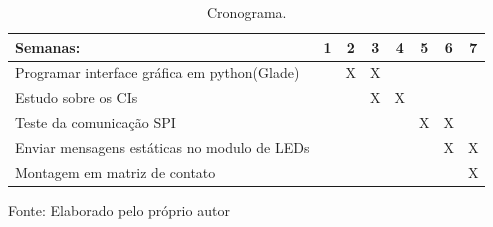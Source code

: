 \begin{table}[H]
	\centering\footnotesize
	\caption{Cronograma.}	
	\begin{tabular}{p{10cm}S[table-format=0.5]S[table-format=0.5]S[table-format=0.5]S[table-format=0.5]S[table-format=0.2]S[table-format=0.2]S[table-format=0.2]}
		\toprule	
		{Semanas:} & {1} & {2} & {3} & {4} & {5} & {6} & {7}\\
		\midrule
		
		Programar interface gráfica em python(Glade)  &  & X & X &  &  &  &  \\
		Estudo sobre os CIs &  &  & X & X &  &  &\\
		Teste da comunicação SPI    &  &  &  &  & X & X &  \\ 
		Enviar mensagens estáticas no modulo de LEDs   &  &  &  &  &  & X & X \\
		Montagem em matriz de contato & & & & & & & X\\
		\bottomrule
	\end{tabular}
	\label{table:cronogramaT1}
	\par Fonte: Elaborado pelo próprio autor
\end{table}		